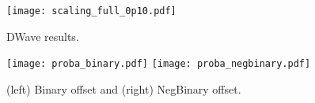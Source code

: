 \documentclass[]{article}
\begin{document}
\begin{figure}[htb]
	\centering
	\texttt{[image: scaling\_full\_0p10.pdf]}
	\caption{\label{fig:dwave_result} DWave results.
	}
\end{figure}


\begin{figure}[htb]
	\centering
	\texttt{[image: proba\_binary.pdf]}
	\texttt{[image: proba\_negbinary.pdf]}
	\caption{\label{fig:proba_dwave} (left) Binary offset and (right) NegBinary offset.
	}
\end{figure}
\end{document}

